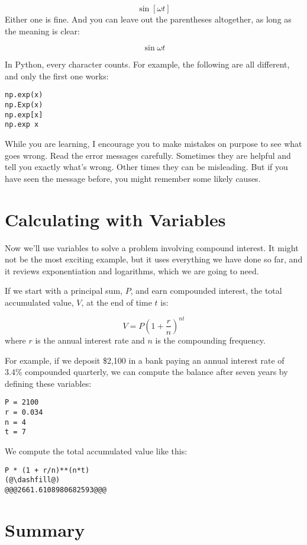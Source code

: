 \[\sin [\omega t]\]
Either one is fine. And you can leave out the parentheses altogether, as
long as the meaning is clear:

\[\sin \omega t\]

In Python, every character counts. For example, the following are all
different, and only the first one works:

\begin{lstlisting}
np.exp(x)
np.Exp(x)
np.exp[x]
np.exp x
\end{lstlisting}

While you are learning, I encourage you to make mistakes on purpose to
see what goes wrong. Read the error messages carefully. Sometimes they
are helpful and tell you exactly what's wrong. Other times they can be
misleading. But if you have seen the message before, you might remember
some likely causes.

\hypertarget{calculating-with-variables}{%
\section{Calculating with Variables}\label{calculating-with-variables}}

Now we'll use variables to solve a problem involving compound interest.
It might not be the most exciting example, but it uses everything we
have done so far, and it reviews exponentiation and logarithms, which we
are going to need.

If we start with a principal sum, \(P\), and earn compounded interest,
the total accumulated value, \(V\), at the end of time \(t\) is:

\[V=P\left(1+{\frac {r}{n}}\right)^{nt}\]
where \(r\) is the annual interest rate and \(n\) is the compounding
frequency.

For example, if we deposit \$2,100 in a bank paying an annual interest
rate of 3.4\% compounded quarterly, we can compute the balance after seven
years by defining these variables:

\begin{lstlisting}[]
P = 2100
r = 0.034
n = 4
t = 7
\end{lstlisting}

We compute the total accumulated value like this:

\begin{lstlisting}[]
P * (1 + r/n)**(n*t)
(@\dashfill@)
@@@2661.6108980682593@@@
\end{lstlisting}

\hypertarget{summary}{%
\section{Summary}\label{summary}}

